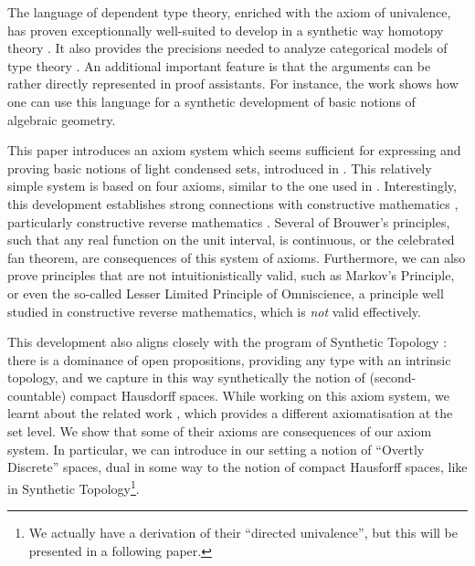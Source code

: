 The language of dependent type theory, enriched with the axiom of univalence, has proven exceptionnally well-suited to
develop in a synthetic way homotopy theory \cite{hott}. It also provides
the precisions needed to analyze categorical models of type theory \cite{vanderweide2024}. An additional
important feature is that
the arguments can be rather directly represented in proof assistants. For instance, the work \cite{draft} shows how one can use
this language for a synthetic development of basic notions of algebraic geometry.

This paper introduces
an axiom system which seems sufficient for expressing and proving basic notions of light condensed
sets, introduced in \cite{Scholze}.
This relatively simple system is based on four axioms, similar to the one used
in \cite{draft}. Interestingly, this development establishes strong connections with constructive mathematics \cite{Bishop},
particularly constructive reverse mathematics \cite{ReverseMathsBishop,HannesDiener}. Several of Brouwer's principles, such that
any real function on the unit interval, is continuous, or the celebrated fan theorem, are consequences of this system
of axioms. Furthermore, we can also prove principles that are not intuitionistically valid, such as Markov's Principle,
or even the so-called Lesser Limited Principle of Omniscience, a principle well studied in constructive reverse mathematics,
which is {\em not} valid effectively.

This development also aligns closely with the program of Synthetic
Topology \cite{SyntheticTopologyEscardo,SyntheticTopologyLesnik}:
there is a dominance of open propositions, providing any type with an intrinsic
topology, and we capture in this way synthetically the notion of (second-countable) compact Hausdorff spaces.
While working on this axiom system, we learnt about the related work \cite{bc24}, which provides a different axiomatisation
at the set level. We show that some of their axioms are consequences of our axiom system. In particular, we can introduce
in our setting a notion of ``Overtly Discrete'' spaces, dual in some way to the notion of compact Hausforff spaces, like
in Synthetic Topology\footnote{We actually have a
derivation of their ``directed univalence'', but this will be presented in a following paper.}.

